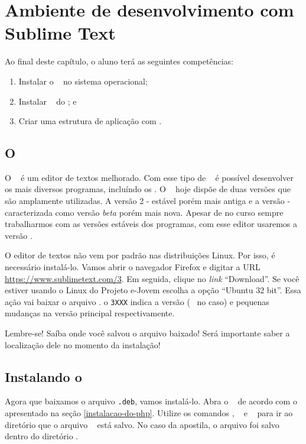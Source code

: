 \chapter{Ambiente de desenvolvimento com Sublime Text}

Ao final deste capítulo, o aluno terá as seguintes competências:
\begin{enumerate}
	\item Instalar o \sublime \sublimeversao~ no sistema operacional;
	\item Instalar \plugins~ do \sublime; e
	\item Criar uma estrutura de aplicação \web com \php. 
\end{enumerate}

\section{O \sublime}
\label{o-sublime}

O \sublime~ é um editor de textos melhorado. Com esse tipo de \software~
é possível desenvolver os mais diversos programas, incluíndo os \sites. 
O \sublime~ hoje dispõe de duas versões que são amplamente utilizadas. 
A versão 2 - estável porém mais antiga e a versão \sublimeversao - caracterizada como 
versão \textit{beta} porém mais nova. Apesar de no curso sempre trabalharmos com 
as versões estáveis dos programas, com esse editor usaremos a versão \sublimeversao.

O editor de textos não vem por padrão nas distribuições Linux. Por isso, é necessário instalá-lo. 
Vamos abrir o navegador Firefox e digitar a URL \url{https://www.sublimetext.com/3}.
Em seguida, clique no \textit{link} ``Download''. Se você estiver usando o Linux do Projeto e-Jovem
escolha a opção ``Ubuntu 32 bit''. Essa ação vai baixar o arquivo \sublimefilename.
o \texttt{3XXX} indica a versão (\sublimeversao~ no caso) e pequenas mudanças na 
versão principal respectivamente.

Lembre-se! Saíba onde você salvou o arquivo baixado! Será importante saber a 
localização dele no momento da instalação!

\section{Instalando o \sublime}
\label{instalando-o-sublime}

Agora que baixamos o arquivo \texttt{.deb}, vamos instalá-lo. Abra o \terminal~ de acordo
com o apresentado na seção \ref{instalacao-do-php}. Utilize os comandos \comandocdcompleto, 
\comandolscompleto~ e \comandopwdcompleto~ para ir ao diretório que o arquivo 
\sublimefilename~ está salvo. No caso da apostila, o arquivo foi salvo dentro do 
diretório .

